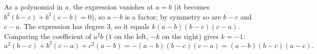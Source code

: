 As a polynomial in $a$, the expression vanishes at $a=b$ (it becomes $b^2(b-c)+b^2(c-b)=0$), so $a-b$ is a factor; by symmetry so are $b-c$ and $c-a$. The expression has degree $3$, so it equals $k(a-b)(b-c)(c-a)$. Comparing the coefficient of $a^2b$ ($1$ on the left, $-k$ on the right) gives $k=-1$:
\[a^2(b-c)+b^2(c-a)+c^2(a-b)=\boxed{-(a-b)(b-c)(c-a)}=(a-b)(b-c)(a-c).\]
